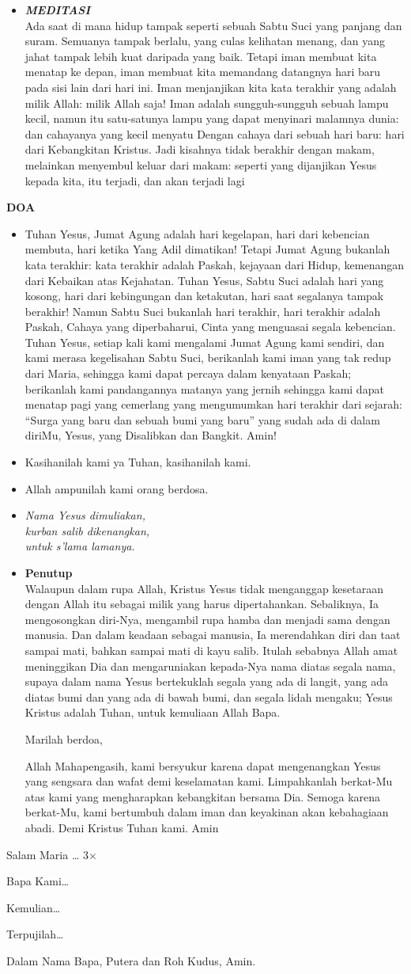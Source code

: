 \documentclass[a5paper,titlepage,11pt,openany]{scrbook}
\newcommand{\BU}[1]{\begin{itemize} \item[U:] #1 \end{itemize}}
\newcommand{\BP}[1]{\begin{itemize} \item[P:] #1 \end{itemize}}
\newcommand{\kasihanilahKami}{\BP{Kasihanilah kami ya Tuhan, kasihanilah kami.}
\BU{Allah ampunilah kami orang berdosa.}}
\newcommand{\BPii}[1]
{\begin{itemize} \item[P2:] \textbf{\emph{MEDITASI}}\\#1 \end{itemize}}
\newcommand{\lagu}[2]{%
\begin{itemize}
\item[#1.] \it{#2}
\end{itemize}}
\begin{document}
\BPii{
	Ada saat di mana hidup tampak seperti sebuah Sabtu Suci yang panjang dan suram. Semuanya tampak berlalu, yang culas kelihatan menang, dan yang jahat tampak lebih kuat daripada yang baik. Tetapi iman membuat kita menatap ke depan, iman membuat kita memandang datangnya hari baru pada sisi lain dari hari ini. Iman menjanjikan kita kata terakhir yang adalah milik Allah: milik Allah saja! Iman adalah sungguh-sungguh sebuah lampu kecil, namun itu satu-satunya lampu yang dapat menyinari malamnya dunia: dan cahayanya yang kecil menyatu Dengan cahaya dari sebuah hari baru: hari dari Kebangkitan Kristus. Jadi kisahnya tidak berakhir dengan makam, melainkan menyembul keluar dari makam: seperti yang dijanjikan Yesus kepada kita,  itu terjadi, dan akan terjadi lagi}

\textbf{DOA}

\BU{Tuhan Yesus, Jumat Agung adalah hari kegelapan, hari dari kebencian membuta, hari ketika Yang Adil dimatikan! Tetapi Jumat Agung bukanlah kata terakhir: kata terakhir adalah Paskah, kejayaan dari Hidup, kemenangan dari Kebaikan atas Kejahatan. Tuhan Yesus, Sabtu Suci adalah hari yang kosong, hari dari kebingungan dan ketakutan, hari saat segalanya tampak berakhir! Namun Sabtu Suci bukanlah hari terakhir, hari terakhir adalah Paskah, Cahaya yang diperbaharui, Cinta yang menguasai segala kebencian. Tuhan Yesus, setiap kali kami mengalami Jumat Agung kami sendiri, dan kami merasa kegelisahan Sabtu Suci, berikanlah kami iman yang tak redup dari Maria, sehingga kami dapat percaya dalam kenyataan Paskah; berikanlah kami pandangannya matanya yang jernih sehingga kami dapat menatap pagi yang cemerlang yang mengumumkan hari terakhir dari sejarah: ``Surga yang baru dan sebuah bumi yang baru'' yang sudah ada di dalam diriMu, Yesus, yang Disalibkan dan Bangkit. Amin! }

\kasihanilahKami

\lagu{15}{Nama Yesus dimuliakan,\\
kurban salib dikenangkan,\\
untuk s'lama lamanya.}

\BP{\textbf{Penutup}\\Walaupun dalam rupa Allah, Kristus Yesus tidak menganggap kesetaraan dengan Allah itu sebagai milik yang harus dipertahankan. Sebaliknya, Ia mengosongkan diri-Nya, mengambil rupa hamba dan menjadi sama dengan manusia. Dan dalam keadaan sebagai manusia, Ia merendahkan diri dan taat sampai mati, bahkan sampai mati di kayu salib. Itulah sebabnya Allah amat meninggikan Dia dan mengaruniakan kepada-Nya nama diatas segala nama, supaya dalam nama Yesus bertekuklah segala yang ada di langit, yang ada diatas bumi dan yang ada di bawah bumi, dan segala lidah mengaku; Yesus Kristus adalah Tuhan, untuk kemuliaan Allah Bapa.

	Marilah berdoa,

	Allah Mahapengasih, kami bersyukur karena dapat mengenangkan Yesus yang sengsara dan wafat demi keselamatan kami. Limpahkanlah berkat-Mu atas kami yang mengharapkan kebangkitan bersama Dia. Semoga karena berkat-Mu, kami bertumbuh dalam iman dan keyakinan akan kebahagiaan abadi. Demi Kristus Tuhan kami. Amin}


Salam Maria \ldots{} 3$\times$


Bapa Kami\ldots{}


Kemulian\ldots{}


Terpujilah\ldots{}


Dalam Nama Bapa, Putera dan Roh Kudus, Amin.
\end{document}
